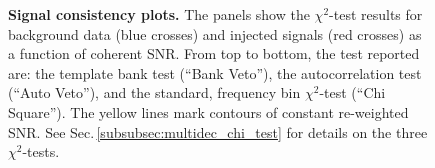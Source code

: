 \documentclass[binding=0.6cm, LaM]{sapthesis}
\begin{document}
        \begin{figure}[!t]
          \noindent
          \label{signalconsistencyplots1}
          \centering
          \caption{\textbf{Signal consistency plots.} The panels show the $\chi^2$-test results for background data (blue crosses) and injected signals (red crosses) as a function of coherent SNR.   From top to bottom, the test reported are: the template bank test (``Bank Veto''), the autocorrelation test (``Auto Veto''), and the standard, frequency bin $\chi^2$-test (``Chi Square'').   The yellow lines mark contours of constant re-weighted SNR. See Sec.\,\ref{subsubsec:multidec_chi_test} for details on the three $\chi^2$-tests.}
          \label{fig:signalconsistencyplots1}
        \end{figure}
\end{document}
